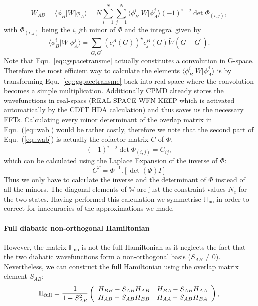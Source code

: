 \documentclass[twoside,10pt,titlepage,a4paper]{article}
\begin{document}
\begin{equation}
\label{eq::wab}
W_{AB}=\langle \phi_B \vert W \vert \phi_A \rangle=N\sum_{i=1}^N \sum_{j=1}^N \langle \phi^i_B \vert W \vert \phi^j_A \rangle  (-1)^{i+j} \det \Phi_{(i,j)},
\end{equation}
with $\Phi_{(i,j)}$ being the $i,j$th minor of $\Phi$ and the integral given by
\begin{equation}
\label{eq::gspacetransme}
\langle \phi^i_B \vert W \vert \phi^j_A \rangle=\sum_{G,G^\prime}(c_i^A(G))^\star c_j^B(G) \tilde{W}(G-G^\prime).
\end{equation}
Note that Equ.~\ref{eq::gspacetransme} actually constitutes a convolution in G-space. Therefore the
most efficient way to calculate the elements $\langle \phi^i_B \vert W \vert \phi^j_A \rangle$ is by
transforming Equ.~\ref{eq::gspacetransme} back into real-space where the convolution becomes a
simple multiplication. Additionally CPMD already stores the wavefunctions in real-space (REAL SPACE
WFN KEEP which is activated automatically by the CDFT HDA calculation) and thus saves us the
necessary FFTs.  Calculating every minor determinant of the overlap matrix in Equ.~(\ref{eq::wab})
would be rather costly, therefore we note that the second part of Equ.~(\ref{eq::wab}) is actually
the cofactor matrix $C$ of $\Phi$.
\begin{equation}
(-1)^{i+j} \det \Phi_{(i,j)}=C_{ij},
\end{equation}
which can be calculated using the Laplace Expansion of the inverse of $\Phi$:
\begin{equation}
C^T=\Phi^{-1}. [\det(\Phi) I ]
\end{equation}
Thus we only have to calculate the inverse and the determinant of $\Phi$ instead of all the minors.
The diagonal elements of $\mathbb{W}$ are just the constraint values $N_c$ for the two states.
Having performed this calculation we symmetrise $\mathbb{H}_\text{no}$ in order to correct for inaccuracies of the approximations we made.

\paragraph{Full diabatic non-orthogonal Hamiltonian}
However, the matrix $\mathbb{H}_\text{no}$ is not the full Hamiltonian as it neglects the fact that
the two diabatic wavefunctions form a non-orthogonal basis ($S_{AB}\neq 0$). Nevertheless, we can
construct the full Hamiltonian using the overlap matrix element $S_{AB}$: \begin{equation}
\mathbb{H}_\text{full}=\frac{1}{1-S_{AB}^2}\left(\begin{array}{c c} H_{BB}-S_{AB}H_{AB} & H_{BA}-S_{AB}H_{AA}\\ H_{AB}-S_{AB}H_{BB} & H_{AA}-S_{AB}H_{BA}\end{array}\right),
\end{equation}
\end{document}
